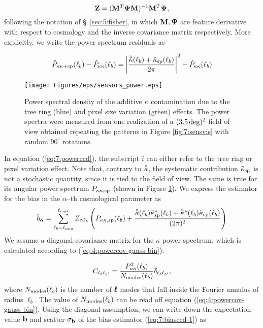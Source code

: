 \begin{equation}
\label{eq:7:zeta}
\mathbf{Z} = (\mathbf{M}^T\mathbf{\Psi}\mathbf{M})^{-1}\mathbf{M}^T\mathbf{\Psi},
\end{equation}
%
following the notation of \S~\ref{sec:5:fisher}, in which $\mathbf{M},\mathbf{\Psi}$ are feature derivative with respect to cosmology and the inverse covariance matrix respectively. More explicitly, we write the power spectrum residuals as 

\begin{equation}
\label{eq:7:powerccd}
\hat{P}_{\kappa\kappa+{\rm sp}}(\ell_b)-\hat{P}_{\kappa\kappa}(\ell_b) = \left\vert\frac{\hat{\tilde{\kappa}}(\ell_b)+\tilde{\kappa}_{\rm sp}(\ell_b)}{2\pi}\right\vert^2-\hat{P}_{\kappa\kappa}(\ell_b) 
\end{equation} 
%
\begin{figure}
\begin{center}
\texttt{[image: Figures/eps/sensors\_power.eps]}
\end{center}
\caption{Power spectral density of the additive $\kappa$ contamination due to the tree ring (blue) and pixel size variation (green) effects. The power spectra were measured from one realization of a $(3.5\,{\rm deg})^2$ field of view obtained repeating the patterns in Figure \ref{fig:7:sensvis} with random $90^\circ$ rotations.}
\label{fig:7:ccdpow}
\end{figure}
%
In equation (\ref{eq:7:powerccd}), the subscript $i$ can either refer to the tree ring or pixel variation effect. Note that, contrary to $\hat{\tilde{\kappa}}$, the systematic contribution $\tilde{\kappa}_{\rm sp}$ is not a stochastic quantity, since it is tied to the field of view. The same is true for its angular power spectrum $P_{\kappa\kappa,{\rm sp}}$ (shown in Figure \ref{fig:7:ccdpow}). We express the estimator for the bias in the $\alpha$--th cosmological parameter as 
\begin{equation}
\label{eq:7:biasccd-1}
\hat{b}_\alpha = \sum_{\ell_b=\ell_{\rm min}}^{\ell_{\rm max}} Z_{\alpha\ell_b}\left(P_{\kappa\kappa,{\rm sp}}(\ell_b)+\frac{\hat{\tilde{\kappa}}(\ell_b)\tilde{\kappa}_{\rm sp}^*(\ell_b)+\hat{\tilde{\kappa}}^*(\ell_b)\tilde{\kappa}_{\rm sp}(\ell_b)}{(2\pi)^2}\right)
\end{equation}
%
We assume a diagonal covariance matrix for the $\kappa$ power spectrum, which is calculated according to (\ref{eq:4:powercov-gauss-bin}): 

\begin{equation}
\label{eq:7:diagcov}
C_{\ell_b\ell_{b'}} = \frac{P^2_{\kappa\kappa}(\ell_b)}{N_{\rm modes}(\ell_b)}\delta_{\ell_b\ell_{b'}},
\end{equation}
%
where $N_{\rm modes}(\ell_b)$ is the number of $\pmb{\ell}$ modes that fall inside the Fourier annulus of radius $\ell_b$. The value of $N_{\rm modes}(\ell_b)$ can be read off equation (\ref{eq:4:powercov-gauss-bin}). Using the diagonal assumption, we can write down the expectation value $\mathbf{b}$ and scatter $\sigma_{\mathbf{b}}$ of the bias estimator (\ref{eq:7:biasccd-1}) as  

